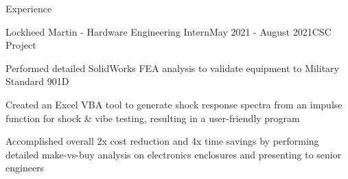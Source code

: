 \documentclass{resume} %
\begin{document}
\begin{rSection}{Experience}
\begin{rSubsection}{Lockheed Martin - Hardware Engineering Intern}{May 2021 - August 2021}{CSC Project}{}

\item Performed detailed SolidWorks FEA analysis to validate equipment to Military Standard 901D
\item Created an Excel VBA tool to generate shock response spectra from an impulse function for shock \& vibe testing, resulting in a user-friendly program
\item Accomplished overall 2x cost reduction and 4x time savings by performing detailed make-vs-buy analysis on electronics enclosures and presenting to senior engineers

\end{rSubsection}

\begin{comment}
\begin{rSubsection}{Department of National Defense - Engineering Intern}{May 2020 - September 2020}{}{}

\item Documented and presented key specifications on armored patrol vehicles for 411 vehicles in 69 variants
\item Reworked procurement documents based on technical requirements from multiple military bases
\item Proofread english-to-french translations of contracts to ensure correctness

\end{rSubsection}

\end{rSection}

\begin{rSection}{Projects \& Publications}

\begin{rSubsection}{Undergraduate Publication}{September 2021 - December 2021}{An Investigation of Magnetic Radiation Shields for Human Space Habitats}{Awad et al.}
\item Designed and conducted an experiment over 6 weeks to measure the viability of a superconducting magnet as an active shield from radiation, GCRs, and lunar regolith for lightweight space travel applications
\item Manufactured a vacuum chamber with a cooling tube configuration, wire feed-through, and a beta particle detector capable of maintaining a vacuum of 0.1 Pa to minimize particle stopping power and reduce condensation
\item Designed superconducting magnet configurations made of superconducting YBCO tape with a vacuum-tight cooling system to maintain critical temperatures of 77K
\item Created a Python program to perform in-depth analysis of the raw data, including noise filtering, curve fitting, and extrapolation to demonstrate clear trends


\end{comment}
\end{rSection}
\end{document}
